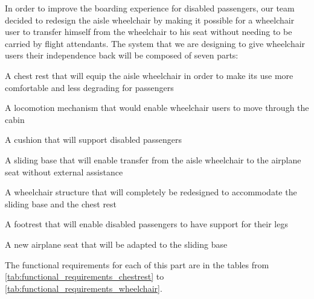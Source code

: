 In order to improve the boarding experience for disabled passengers, our team decided to redesign the aisle wheelchair by making it possible for a wheelchair user to transfer himself from the wheelchair to his seat without needing to be carried by flight attendants. The system that we are designing to give wheelchair users their independence back will be composed of seven parts:

\begin{list}{-}{}
  \item A chest rest that will equip the aisle wheelchair in order to make its use more comfortable and less degrading for passengers
  \item A locomotion mechanism that would enable wheelchair users to move through the cabin
  \item A cushion that will support disabled passengers
  \item A sliding base that will enable transfer from the aisle wheelchair to the airplane seat without external assistance
  \item A wheelchair structure that will completely be redesigned to accommodate the sliding base and the chest rest
  \item A footrest that will enable disabled passengers to have support for their legs
  \item A new airplane seat that will be adapted to the sliding base
\end{list}

The functional requirements for each of this part are in the tables from \ref{tab:functional_requirements_chestrest} to \ref{tab:functional_requirements_wheelchair}.

\newpage

\clearpage
\newpage

